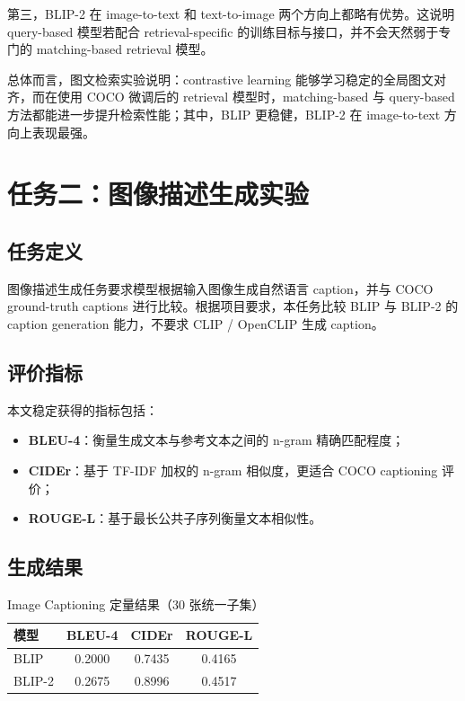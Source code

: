 \documentclass[UTF8,a4paper,10pt]{ctexart}
\begin{document}
第三，BLIP-2 在 image-to-text 和 text-to-image 两个方向上都略有优势。这说明 query-based 模型若配合 retrieval-specific 的训练目标与接口，并不会天然弱于专门的 matching-based retrieval 模型。

总体而言，图文检索实验说明：contrastive learning 能够学习稳定的全局图文对齐，而在使用 COCO 微调后的 retrieval 模型时，matching-based 与 query-based 方法都能进一步提升检索性能；其中，BLIP 更稳健，BLIP-2 在 image-to-text 方向上表现最强。


\section{任务二：图像描述生成实验}

\subsection{任务定义}

图像描述生成任务要求模型根据输入图像生成自然语言 caption，并与 COCO ground-truth captions 进行比较。根据项目要求，本任务比较 BLIP 与 BLIP-2 的 caption generation 能力，不要求 CLIP / OpenCLIP 生成 caption。

\subsection{评价指标}

本文稳定获得的指标包括：

\begin{itemize}
    \item \textbf{BLEU-4}：衡量生成文本与参考文本之间的 n-gram 精确匹配程度；
    \item \textbf{CIDEr}：基于 TF-IDF 加权的 n-gram 相似度，更适合 COCO captioning 评价；
    \item \textbf{ROUGE-L}：基于最长公共子序列衡量文本相似性。
\end{itemize}

\subsection{生成结果}

\begin{table}[H]
    \centering
    \caption{Image Captioning 定量结果（30 张统一子集）}
    \begin{tabular}{lccc}
        \toprule
        模型 & BLEU-4 & CIDEr& ROUGE-L\\
        \midrule
        BLIP & 0.2000 & 0.7435 & 0.4165 \\
        BLIP-2 & 0.2675 & 0.8996 & 0.4517 \\
        \bottomrule
    \end{tabular}
\end{table}
\end{document}
